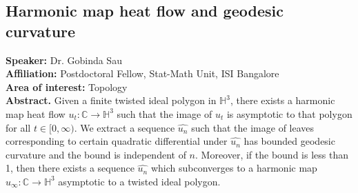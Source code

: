 \subsection*{Harmonic map heat flow and geodesic curvature} %
\noindent
\textbf{Speaker:} Dr. Gobinda Sau \\ %
\textbf{Affiliation:} Postdoctoral Fellow, Stat-Math Unit, ISI Bangalore \\ %
\textbf{Area of interest:} Topology \\

\noindent\textbf{Abstract.} Given a finite twisted ideal polygon in \(\mathbb{H}^3\), there exists a harmonic
map heat flow \(u_t : \mathbb{C} \to \mathbb{H}^3\) such that the image of \(u_t\) is asymptotic to that
polygon for all \(t \in [0, \infty)\). We extract a sequence \(\hat{u_n}\) such that the image
of leaves corresponding to certain quadratic differential under \(\hat{u_n}\) has bounded
geodesic curvature and the bound is independent of \(n\). Moreover, if the bound
is less than 1, then there exists a sequence \(\hat{u_n}\) which subconverges to a harmonic
map \(\hat{u}_\infty : \mathbb{C} \to \mathbb{H}^3\)  asymptotic to a twisted ideal polygon.

